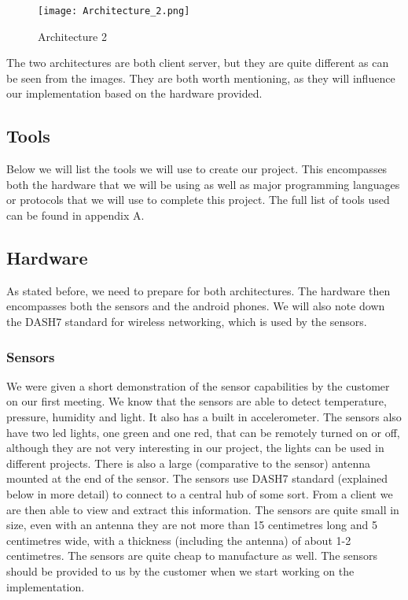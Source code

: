 \documentclass[../document.tex]{subfiles}
\begin{document}
\begin{figure}[H]
	\centering
		\texttt{[image: Architecture\_2.png]}
	\caption{Architecture 2}
\end{figure}

The two architectures are both client server, but they are quite different as can be seen from the images. They are both worth mentioning, as they will influence our implementation based on the hardware provided.

\subsection*{Tools}
Below we will list the tools we will use to create our project. This encompasses both the hardware that we will be using as well as major programming languages or protocols that we will use to complete this project. The full list of tools used can be found in appendix A.

\subsection*{Hardware}
As stated before, we need to prepare for both architectures. The hardware then encompasses both the sensors and the android phones. We will also note down the DASH7 standard for wireless networking, which is used by the sensors.

\subsubsection*{Sensors}
We were given a short demonstration of the sensor capabilities by the customer on our first meeting. We know that the sensors are able to detect temperature, pressure, humidity and light. It also has a built in accelerometer. The sensors also have two led lights, one green and one red, that can be remotely turned on or off, although they are not very interesting in our project, the lights can be used in different projects. There is also a large (comparative to the sensor) antenna mounted at the end of the sensor. The sensors use DASH7 standard (explained below in more detail) to connect to a central hub of some sort. From a client we are then able to view and extract this information. The sensors are quite small in size, even with an antenna they are not more than 15 centimetres long and 5 centimetres wide, with a thickness (including the antenna) of about 1-2 centimetres. The sensors are quite cheap to manufacture as well. The sensors should be provided to us by the customer when we start working on the implementation.
\end{document}
